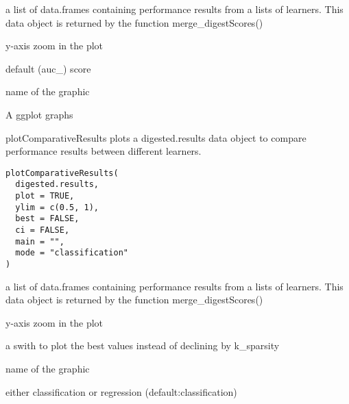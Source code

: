 \documentclass[a4paper]{book}
\begin{document}
%
\begin{Arguments}
\begin{ldescription}
\item[\code{digested.results:}] a list of data.frames containing performance results from a lists of learners. This data object is returned by the function merge\_digestScores()

\item[\code{ylim:}] y-axis zoom in the plot

\item[\code{score:}] default (auc\_) score

\item[\code{main:}] name of the graphic
\end{ldescription}
\end{Arguments}
%
\begin{Value}
A ggplot graphs
\end{Value}
%
\begin{Description}
plotComparativeResults plots a digested.results data object to compare performance results between different learners.
\end{Description}
%
\begin{Usage}
\begin{verbatim}
plotComparativeResults(
  digested.results,
  plot = TRUE,
  ylim = c(0.5, 1),
  best = FALSE,
  ci = FALSE,
  main = "",
  mode = "classification"
)
\end{verbatim}
\end{Usage}
%
\begin{Arguments}
\begin{ldescription}
\item[\code{digested.results:}] a list of data.frames containing performance results from a lists of learners. This data object is returned by the function merge\_digestScores()

\item[\code{ylim:}] y-axis zoom in the plot

\item[\code{best:}] a swith to plot the best values instead of declining by k\_sparsity

\item[\code{main:}] name of the graphic

\item[\code{mode:}] either classification or regression (default:classification)
\end{ldescription}
\end{Arguments}
\end{document}
